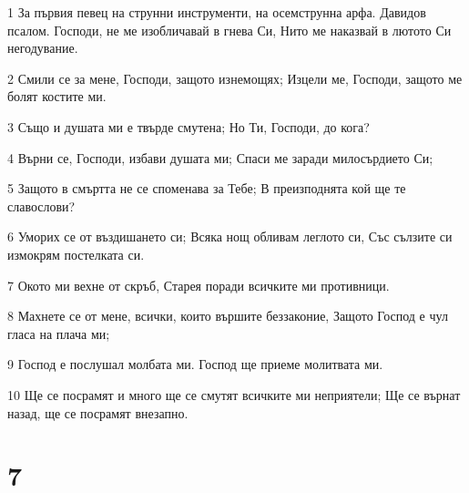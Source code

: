 \par 1 За първия певец на струнни инструменти, на осемструнна арфа. Давидов псалом. Господи, не ме изобличавай в гнева Си, Нито ме наказвай в лютото Си негодувание.
\par 2 Смили се за мене, Господи, защото изнемощях; Изцели ме, Господи, защото ме болят костите ми.
\par 3 Също и душата ми е твърде смутена; Но Ти, Господи, до кога?
\par 4 Върни се, Господи, избави душата ми; Спаси ме заради милосърдието Си;
\par 5 Защото в смъртта не се споменава за Тебе; В преизподнята кой ще те славослови?
\par 6 Уморих се от въздишането си; Всяка нощ обливам леглото си, Със сълзите си измокрям постелката си.
\par 7 Окото ми вехне от скръб, Старея поради всичките ми противници.
\par 8 Махнете се от мене, всички, които вършите беззаконие, Защото Господ е чул гласа на плача ми;
\par 9 Господ е послушал молбата ми. Господ ще приеме молитвата ми.
\par 10 Ще се посрамят и много ще се смутят всичките ми неприятели; Ще се върнат назад, ще се посрамят внезапно.

\chapter{7}

